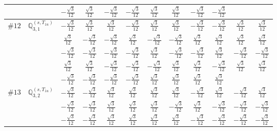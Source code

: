 \documentclass[fleqn,9pt,landscape]{jsarticle}
\begin{document}
\begin{center}
\begin{longtable}{lcccccccccc}
& $ - \frac{\sqrt{3}}{12} $ & $ \frac{\sqrt{3}}{12} $ & $ - \frac{\sqrt{3}}{12} $ & $ - \frac{\sqrt{3}}{12} $ & $ \frac{\sqrt{3}}{12} $ & $ \frac{\sqrt{3}}{12} $ & $ - \frac{\sqrt{3}}{12} $ & $ - \frac{\sqrt{3}}{12} $ & $  $ & $  $ \\ \hline
$ \#12\quad \mathbb{Q}_{3,1}^{(s,T_{1u})} $ & $ - \frac{\sqrt{3}}{12} $ & $ \frac{\sqrt{3}}{12} $ & $ \frac{\sqrt{3}}{12} $ & $ - \frac{\sqrt{3}}{12} $ & $ \frac{\sqrt{3}}{12} $ & $ \frac{\sqrt{3}}{12} $ & $ - \frac{\sqrt{3}}{12} $ & $ - \frac{\sqrt{3}}{12} $ & $ \frac{\sqrt{3}}{12} $ & $ \frac{\sqrt{3}}{12} $ \\
& $ \frac{\sqrt{3}}{12} $ & $ - \frac{\sqrt{3}}{12} $ & $ - \frac{\sqrt{3}}{12} $ & $ \frac{\sqrt{3}}{12} $ & $ - \frac{\sqrt{3}}{12} $ & $ - \frac{\sqrt{3}}{12} $ & $ \frac{\sqrt{3}}{12} $ & $ \frac{\sqrt{3}}{12} $ & $ \frac{\sqrt{3}}{12} $ & $ \frac{\sqrt{3}}{12} $ \\
& $ - \frac{\sqrt{3}}{12} $ & $ - \frac{\sqrt{3}}{12} $ & $ - \frac{\sqrt{3}}{12} $ & $ - \frac{\sqrt{3}}{12} $ & $ \frac{\sqrt{3}}{12} $ & $ - \frac{\sqrt{3}}{12} $ & $ - \frac{\sqrt{3}}{12} $ & $ \frac{\sqrt{3}}{12} $ & $ - \frac{\sqrt{3}}{12} $ & $ - \frac{\sqrt{3}}{12} $ \\
& $ \frac{\sqrt{3}}{12} $ & $ \frac{\sqrt{3}}{12} $ & $ - \frac{\sqrt{3}}{12} $ & $ - \frac{\sqrt{3}}{12} $ & $ - \frac{\sqrt{3}}{12} $ & $ \frac{\sqrt{3}}{12} $ & $ \frac{\sqrt{3}}{12} $ & $ - \frac{\sqrt{3}}{12} $ & $ \frac{\sqrt{3}}{12} $ & $ \frac{\sqrt{3}}{12} $ \\
& $ - \frac{\sqrt{3}}{12} $ & $ - \frac{\sqrt{3}}{12} $ & $ - \frac{\sqrt{3}}{12} $ & $ - \frac{\sqrt{3}}{12} $ & $ \frac{\sqrt{3}}{12} $ & $ \frac{\sqrt{3}}{12} $ & $ \frac{\sqrt{3}}{12} $ & $ \frac{\sqrt{3}}{12} $ & $  $ & $  $ \\ \hline
$ \#13\quad \mathbb{Q}_{3,2}^{(s,T_{1u})} $ & $ - \frac{\sqrt{3}}{12} $ & $ - \frac{\sqrt{3}}{12} $ & $ \frac{\sqrt{3}}{12} $ & $ \frac{\sqrt{3}}{12} $ & $ \frac{\sqrt{3}}{12} $ & $ \frac{\sqrt{3}}{12} $ & $ - \frac{\sqrt{3}}{12} $ & $ \frac{\sqrt{3}}{12} $ & $ - \frac{\sqrt{3}}{12} $ & $ \frac{\sqrt{3}}{12} $ \\
& $ - \frac{\sqrt{3}}{12} $ & $ - \frac{\sqrt{3}}{12} $ & $ \frac{\sqrt{3}}{12} $ & $ \frac{\sqrt{3}}{12} $ & $ \frac{\sqrt{3}}{12} $ & $ - \frac{\sqrt{3}}{12} $ & $ \frac{\sqrt{3}}{12} $ & $ - \frac{\sqrt{3}}{12} $ & $ - \frac{\sqrt{3}}{12} $ & $ - \frac{\sqrt{3}}{12} $ \\
& $ - \frac{\sqrt{3}}{12} $ & $ - \frac{\sqrt{3}}{12} $ & $ \frac{\sqrt{3}}{12} $ & $ \frac{\sqrt{3}}{12} $ & $ \frac{\sqrt{3}}{12} $ & $ \frac{\sqrt{3}}{12} $ & $ - \frac{\sqrt{3}}{12} $ & $ - \frac{\sqrt{3}}{12} $ & $ - \frac{\sqrt{3}}{12} $ & $ - \frac{\sqrt{3}}{12} $ \\

\end{longtable}
\end{center}
\end{document}

